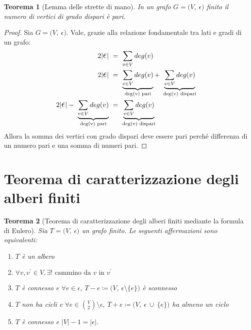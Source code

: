 \documentclass[12pt,twoside]{article}
\newcommand{\pr}{\prime}
\newcommand{\Eps}{${\Large$\epsilon$}$}
\newcommand{\grafo}{(V, \: \Eps)}
\newtheorem{theorem}{Teorema}
\begin{document}
\begin{theorem}[Lemma delle strette di mano]
In un grafo $G = \grafo$ finito il numero di vertici di grado dispari è pari.
\end{theorem}

\begin{proof}
Sia $G = \grafo$. Vale, grazie alla relazione fondamentale tra lati e gradi di un grafo:
\begin{align*}
2 | \mathlarger{\mathlarger{\epsilon}} | \ &=\ \sum_{v\in V} deg (v) \\
2 | \mathlarger{\mathlarger{\epsilon}} | \ &= \ \underbrace{\sum_{v\in V} deg (v)}_{\text{deg(v) pari}} + \ \underbrace{\sum_{v\in V} deg (v)}_{\text{deg(v) dispari}} \\
2 | \mathlarger{\mathlarger{\epsilon}}| - \ \underbrace{\sum_{v\in V} deg (v)}_{\text{deg(v) pari}} \ &= \ \underbrace{\sum_{v\in V} deg (v)}_{\text{deg(v) dispari}} 
\end{align*}
Allora la somma dei vertici con grado dispari deve essere pari perché differenza di un numero pari e una somma di numeri pari.
\end{proof}

\section{Teorema di caratterizzazione degli alberi finiti}
\begin{theorem}[Teorema di caratterizzazione degli alberi finiti mediante la formula di Eulero]
Sia $T = \grafo$ un grafo finito. Le seguenti affermazioni sono equivalenti:
\begin{enumerate}
\item $T$ è un albero
\item $\forall v, v^{\pr} \in V, \exists! \text{ cammino da } v \text{ in } v^{\pr}$
\item $T$ è connesso e $\forall e \in \Eps,\ T-e \coloneqq (V,\ \Eps \setminus \{e\})$ è sconnesso
\item $T$ non ha cicli e $\forall e \in \binom{V}{2} \setminus \Eps, \ T + e \coloneqq (V, \ \Eps \ \cup \ \{e\})$ ha almeno un ciclo
\item $T$ è connesso e $|V| - 1 = |\Eps|$.
\end{enumerate}
\end{theorem}
\end{document}
